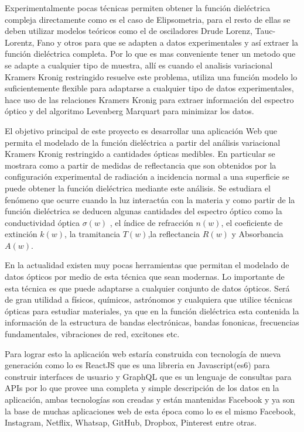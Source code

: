 \documentclass[a4paper,openright,12pt]{book}
\begin{document}
Experimentalmente pocas técnicas permiten obtener la función dieléctrica compleja directamente como es el caso de Elipsometria, para el resto de ellas se deben utilizar modelos teóricos como el de osciladores Drude Lorenz, Tauc-Lorentz, Fano y otros para que se adapten a datos experimentales y así extraer la función dieléctrica completa. Por lo que es mas conveniente tener un metodo que se adapte a cualquier tipo de muestra, allí es cuando el analisis variacional Kramers Kronig restringido resuelve este problema, utiliza una función modelo lo suficientemente flexible para adaptarse a cualquier tipo de datos experimentales, hace uso de las relaciones Kramers Kronig para extraer información del espectro óptico y del algoritmo Levenberg Marquart para minimizar los datos.

El objetivo principal de este proyecto es desarrollar una aplicación Web que permita el modelado de la función dieléctrica a partir del análisis variacional Kramers Kronig restringido a cantidades ópticas medibles. En particular se mostrara como a partir de medidas de reflectancia que son obtenidos por la configuración experimental de radiación a incidencia normal a una superficie se puede obtener la función dieléctrica mediante este análisis. Se estudiara el fenómeno que ocurre cuando la luz interactúa con la materia y como partir de la función dieléctrica se deducen algunas cantidades del espectro óptico como la conductividad óptica $\sigma(w)$ , el índice de refracción $n(w)$, el coeficiente de extinción $k(w)$, la tramitancia $T(w)$,la reflectancia $R(w)$ y Absorbancia  $A(w)$.

En la actualidad existen muy pocas herramientas que permitan el modelado de datos ópticos por medio de esta técnica que sean modernas. Lo importante de esta técnica es que puede adaptarse a cualquier conjunto de datos ópticos. Será de gran utilidad a físicos, químicos, astrónomos y cualquiera que utilice técnicas ópticas para estudiar materiales, ya que en la función dieléctrica esta contenida la información de la estructura de bandas electrónicas, bandas fononicas, frecuencias fundamentales, vibraciones de red, excitones etc. 

Para lograr esto la aplicación web estaría construida con tecnología de nueva generación como lo es ReactJS que es una libreria en Javascript(es6) para construir interfaces de usuario y GraphQL que es un lenguaje de consultas para APIs por lo que provee una completa y simple descripción de los datos en la aplicación, ambas  tecnologías son creadas y están mantenidas Facebook y ya son la base de muchas aplicaciones web de esta época como lo es el mismo Facebook, Instagram, Netflix, Whatsap, GitHub, Dropbox, Pinterest entre otras.
\end{document}
